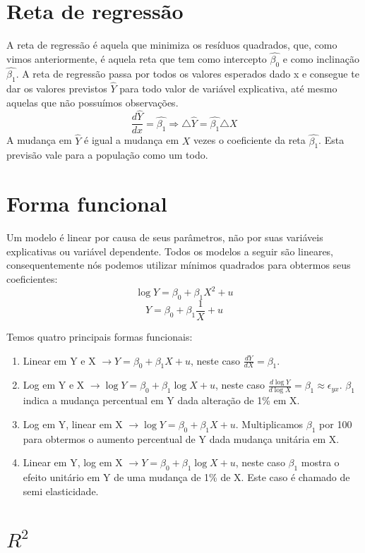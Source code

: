 \documentclass[12pt,a4paper,oneside,brazil]{abntex2}
\begin{document}
 \section{Reta de regressão}
 A reta de regressão é aquela que minimiza os resíduos quadrados, que, como vimos anteriormente, é aquela reta que tem como intercepto $\hat{\beta_0}$ e como inclinação $\hat{\beta_1}$. A reta de regressão passa por todos os valores esperados dado x e consegue te dar os valores previstos $\hat{Y}$ para todo valor de variável explicativa, até mesmo aquelas que não possuímos observações.
 \[ \frac{d\hat{Y}}{dx} = \hat{\beta_1} \Rightarrow \triangle \hat{Y} = \hat{\beta_1} \triangle X \]
A mudança em $ \hat{Y}$ é igual a mudança em $X$ vezes o coeficiente da reta $\hat{\beta_1}$. Esta previsão vale para a população como um todo.

\section{Forma funcional}
Um modelo é linear por causa de seus parâmetros, não por suas variáveis explicativas ou variável dependente. Todos os modelos a seguir são lineares, consequentemente nós podemos utilizar mínimos quadrados para obtermos seus coeficientes:
\[ \log Y = \beta_0 + \beta_1 X^2+ u \]
\[ Y = \beta_0 + \beta_1 \frac{1}{X} + u \]

Temos quatro principais formas funcionais:
\begin{enumerate}
\item Linear em Y e X $\rightarrow Y = \beta_0 + \beta_1 X + u$, neste caso $\frac{d Y}{d X} = \beta_1$.
\item Log em Y e  X $ \rightarrow \log Y = \beta_0 + \beta_1 \log X + u$, neste caso $\frac{d \log Y}{d \log X} = \beta_1 \approx \epsilon_{yx}$. $\beta_1$ indica a mudança percentual em Y dada alteração de 1\% em X.
\item Log em Y, linear em X $ \rightarrow \log Y = \beta_0 + \beta_1  X + u$. Multiplicamos $\beta_1$ por 100 para obtermos o aumento percentual de Y dada mudança unitária em X.
\item Linear em Y, log em X $ \rightarrow Y = \beta_0 + \beta_1 \log X + u$, neste caso $\beta_1$ mostra o efeito unitário em Y de uma mudança de 1\% de X. Este caso é chamado de semi elasticidade.
\end{enumerate}

\section{$R^2$}
\end{document}
